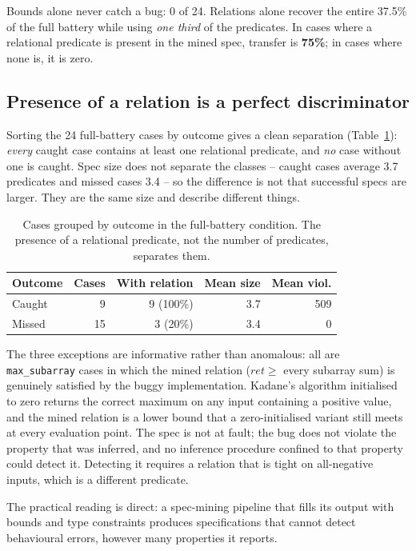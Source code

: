 \documentclass[conference]{IEEEtran}
\begin{document}
Bounds alone never catch a bug: 0 of 24. Relations alone recover the entire 37.5\% of the
full battery while using \emph{one third} of the predicates. In cases where a relational
predicate is present in the mined spec, transfer is \textbf{75\%}; in cases where none is,
it is zero.

\subsection{Presence of a relation is a perfect discriminator}

Sorting the 24 full-battery cases by outcome gives a clean separation
(Table~\ref{tab:disc}): \emph{every} caught case contains at least one relational
predicate, and \emph{no} case without one is caught. Spec size does not separate the
classes -- caught cases average 3.7 predicates and missed cases 3.4 -- so the difference is
not that successful specs are larger. They are the same size and describe different things.

\begin{table}[t]
\centering
\caption{Cases grouped by outcome in the full-battery condition. The presence of a
relational predicate, not the number of predicates, separates them.}
\label{tab:disc}
\small
\begin{tabular}{@{}lrrrr@{}}
\toprule
Outcome & Cases & With relation & Mean size & Mean viol. \\
\midrule
Caught & 9 & 9 (100\%) & 3.7 & 509 \\
Missed & 15 & 3 (20\%) & 3.4 & 0 \\
\bottomrule
\end{tabular}
\end{table}

The three exceptions are informative rather than anomalous: all are
\texttt{max\_subarray} cases in which the mined relation
($\mathit{ret} \ge$ every subarray sum) is genuinely satisfied by the buggy
implementation. Kadane's algorithm initialised to zero returns the correct maximum on any
input containing a positive value, and the mined relation is a lower bound that a
zero-initialised variant still meets at every evaluation point. The spec is not at fault;
the bug does not violate the property that was inferred, and no inference procedure
confined to that property could detect it. Detecting it requires a relation that is tight
on all-negative inputs, which is a different predicate.

The practical reading is direct: a spec-mining pipeline that fills its output with bounds
and type constraints produces specifications that cannot detect behavioural errors, however
many properties it reports.
\end{document}
